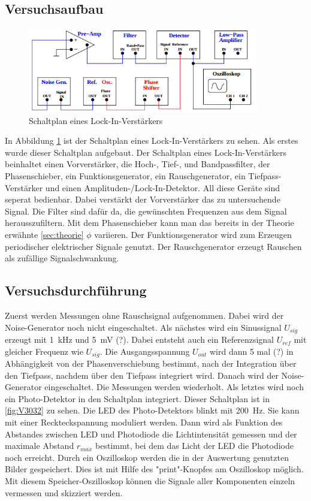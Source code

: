 \documentclass[
  bibliography=totoc,     %
  captions=tableheading,  %
  titlepage=firstiscover, %
]{scrartcl}
\begin{document}
\subsection{Versuchsaufbau}
\label{sec:aufbau}
\begin{figure}[htb]
  \centering
  \includegraphics[width=0.9\textwidth]{V3031.png}
  \caption{Schaltplan eines Lock-In-Verstärkers}
  \label{fig:V3031}
\end{figure}
In Abbildung \ref{fig:V3031} ist der Schaltplan eines Lock-In-Verstärkers zu
sehen. Als erstes wurde dieser Schaltplan aufgebaut. Der Schaltplan eines
Lock-In-Verstärkers beinhaltet einen Vorverstärker, die Hoch-, Tief-, und
Bandpassfilter, der Phasenschieber, ein Funktionsgenerator, ein Rauschgenerator,
ein Tiefpass-Verstärker und einen Amplituden-/Lock-In-Detektor. All diese Geräte
sind seperat bedienbar. Dabei verstärkt der Vorverstärker das zu untersuchende
Signal. Die Filter sind dafür da, die gewünschten Frequenzen aus dem Signal
herausszufiltern. Mit dem Phasenschieber kann man das bereits in der Theorie
erwähnte \ref{sec:theorie} $\phi$ variieren. Der Funktionsgenerator wird zum
Erzeugen periodischer elektrischer Signale genutzt.
Der Rauschgenerator erzeugt Rauschen als zufällige Signalschwankung.
\subsection{Versuchsdurchführung}
\label{sec:versuchsdurchführung}
Zuerst werden Messungen ohne Rauschsignal aufgenommen. Dabei wird der
Noise-Generator noch nicht eingeschaltet. Als nächstes wird ein Sinussignal $U_{sig}$
erzeugt mit \SI{1}{kHz} und \SI{5}{mV} (?). Dabei entsteht auch ein Referenzsignal
$U_{ref}$ mit gleicher Frequenz wie $U_{sig}$. Die Ausgangsspannung $U_{out}$
wird dann 5 mal (?) in Abhängigkeit von der Phasenverschiebung bestimmt, nach
der Integration über den Tiefpass, nachdem über den Tiefpass integriert wird.
Danach wird der Noise-Generator eingeschaltet. Die Messungen werden wiederholt.
Als letztes wird noch ein Photo-Detektor in den Schaltplan integriert. Dieser
Schaltplan ist in \ref{fig:V3032} zu sehen. Die LED des Photo-Detektors blinkt
mit \SI{200}{Hz}. Sie kann mit einer Reckteckspannung moduliert werden.
Dann wird als Funktion des Abstandes zwischen LED und Photodiode die
Lichtintensität gemessen und der maximale Abstand $r_{max}$ bestimmt, bei dem
das Licht der LED die Photodiode noch erreicht.
Durch ein Oszilloskop werden die in der Auswertung genutzten Bilder gespeichert.
Dies ist mit Hilfe des "print"-Knopfes am Oszilloskop möglich.
Mit diesem Speicher-Oszilloskop können die Signale aller Komponenten einzeln
vermessen und skizziert werden.
\end{document}
